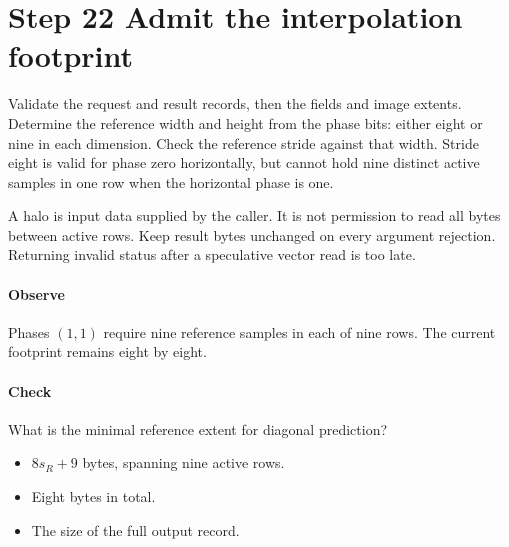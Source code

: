 \section{Step 22 Admit the interpolation footprint}\label{h263-prediction-s02}
Validate the request and result records, then the fields and image extents.
Determine the reference width and height from the phase bits: either eight or
nine in each dimension. Check the reference stride against that width. Stride
eight is valid for phase zero horizontally, but cannot hold nine distinct active
samples in one row when the horizontal phase is one.

A halo is input data supplied by the caller. It is not permission to read all
bytes between active rows. Keep result bytes unchanged on every argument
rejection. Returning invalid status after a speculative vector read is too late.

\paragraph{Observe} Phases $(1,1)$ require nine reference samples in each of
nine rows. The current footprint remains eight by eight.
\paragraph{Check} What is the minimal reference extent for diagonal prediction?
\begin{itemize}
  \item[A.] $8s_R+9$ bytes, spanning nine active rows.
  \item[B.] Eight bytes in total.
  \item[C.] The size of the full output record.
\end{itemize}
